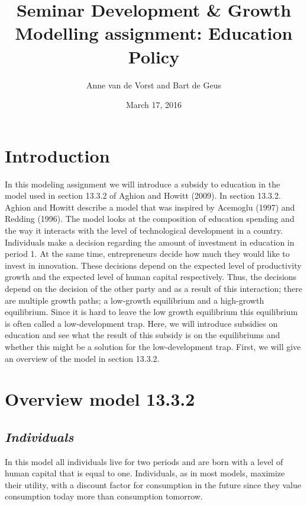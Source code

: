 \documentclass[a4paper,11pt]{article} %
\begin{document}
\title{%
  \large Seminar Development \& Growth \\
  \huge Modelling assignment: Education Policy}
\author{Anne van de Vorst and Bart de Geus}
\date{March 17, 2016}
\maketitle


\section{Introduction}
In this modeling assignment we will introduce a subsidy to education in the model used in section 13.3.2 of Aghion and Howitt (2009). In section 13.3.2. Aghion and Howitt describe a model that was inspired by Acemoglu (1997) and Redding (1996). The model looks at the composition of education spending and the way it interacts with the level of technological development in a country. Individuals make a decision regarding the amount of investment in education in period 1. At the same time, entrepreneurs decide how much they would like to invest in innovation. These decisions depend on the expected level of productivity growth and the expected level of human capital respectively. Thus, the decisions depend on the decision of the other party and as a result of this interaction; there are multiple growth paths; a low-growth equilibrium and a high-growth equilibrium. Since it is hard to leave the low growth equilibrium this equilibrium is often called a low-development trap. Here, we will introduce subsidies on education and see what the result of this subsidy is on the equilibriums and whether this might be a solution for the low-development trap. First, we will give an overview of the model in section 13.3.2.

\section{Overview model 13.3.2}
\subsection*{\textit{Individuals}} %
In this model all individuals live for two periods and are born with a level of human capital that is equal to one. Individuals, as in most models, maximize their utility, with a discount factor for consumption in the future since they value consumption today more than consumption tomorrow.
 
\end{document}
